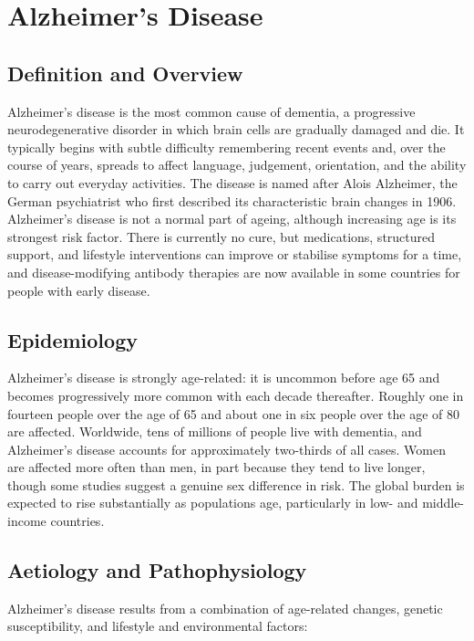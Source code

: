 \chapter{Alzheimer's Disease}

\section*{Definition and Overview}
Alzheimer's disease is the most common cause of dementia, a progressive neurodegenerative disorder in which brain cells are gradually damaged and die. It typically begins with subtle difficulty remembering recent events and, over the course of years, spreads to affect language, judgement, orientation, and the ability to carry out everyday activities. The disease is named after Alois Alzheimer, the German psychiatrist who first described its characteristic brain changes in 1906. Alzheimer's disease is not a normal part of ageing, although increasing age is its strongest risk factor. There is currently no cure, but medications, structured support, and lifestyle interventions can improve or stabilise symptoms for a time, and disease-modifying antibody therapies are now available in some countries for people with early disease.

\section*{Epidemiology}
Alzheimer's disease is strongly age-related: it is uncommon before age 65 and becomes progressively more common with each decade thereafter. Roughly one in fourteen people over the age of 65 and about one in six people over the age of 80 are affected. Worldwide, tens of millions of people live with dementia, and Alzheimer's disease accounts for approximately two-thirds of all cases. Women are affected more often than men, in part because they tend to live longer, though some studies suggest a genuine sex difference in risk. The global burden is expected to rise substantially as populations age, particularly in low- and middle-income countries.

\section*{Aetiology and Pathophysiology}
Alzheimer's disease results from a combination of age-related changes, genetic susceptibility, and lifestyle and environmental factors:

